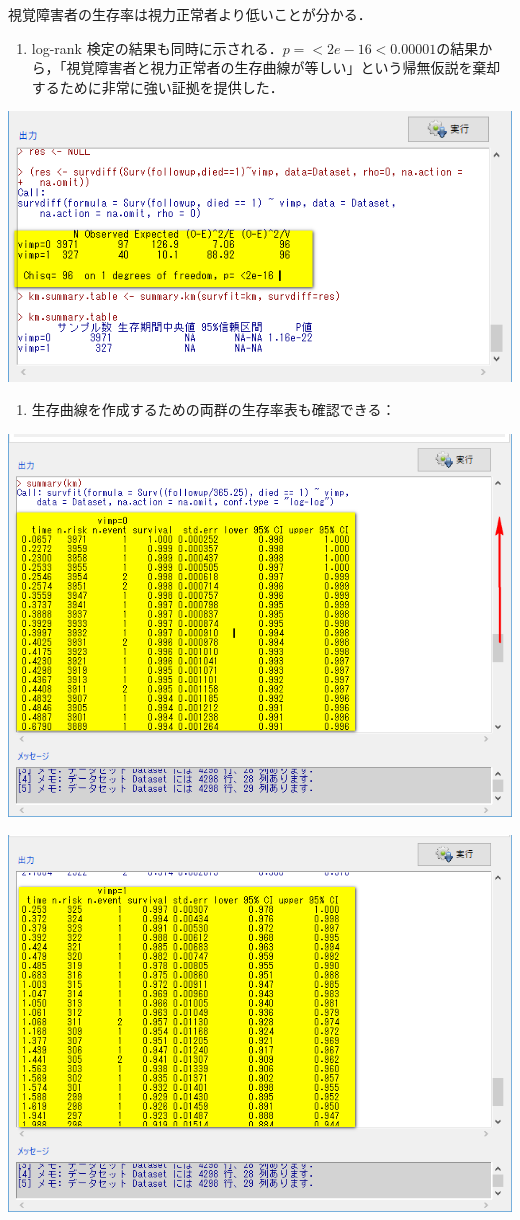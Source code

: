 \documentclass[11pt,]{problemset}
\providecommand{\tightlist}{%
  \setlength{\itemsep}{0pt}\setlength{\parskip}{0pt}}
\begin{document}
視覚障害者の生存率は視力正常者より低いことが分かる．

\begin{enumerate}
\def\labelenumi{\arabic{enumi}.}
\setcounter{enumi}{3}
\tightlist
\item
  log-rank
  検定の結果も同時に示される．\(p = <2e-16 < 0.00001\)の結果から，「視覚障害者と視力正常者の生存曲線が等しい」という帰無仮説を棄却するために非常に強い証拠を提供した．
\end{enumerate}

\begin{center}\includegraphics[width=0.6\linewidth,height=0.4\textheight]{pic/survival10} \end{center}

\newpage

\begin{enumerate}
\def\labelenumi{\arabic{enumi}.}
\setcounter{enumi}{4}
\tightlist
\item
  生存曲線を作成するための両群の生存率表も確認できる：
\end{enumerate}

\begin{center}\includegraphics[width=0.6\linewidth,height=0.4\textheight]{pic/survival11} \end{center}

\begin{center}\includegraphics[width=0.6\linewidth,height=0.4\textheight]{pic/survival12} \end{center}
\end{document}
